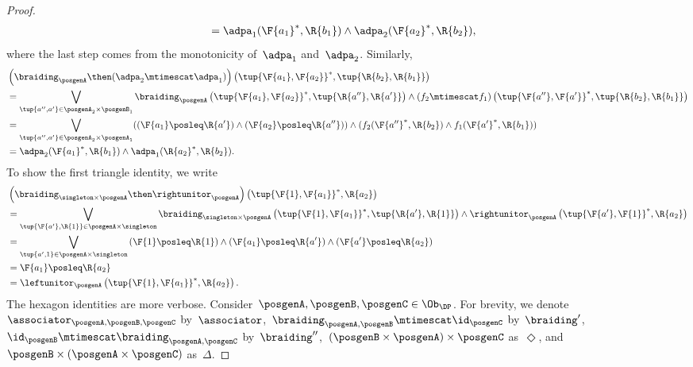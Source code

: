 \begin{proof}
\begin{equation}
\begin{aligned}
            &= \adpa_1(\F{a_1}^*,\R{b_1}) \wedge \adpa_2(\F{a_2}^*,\R{b_2}),
        \end{aligned}
    \end{equation}
    where the last step comes from the monotonicity of~$\adpa_1$ and~$\adpa_2$. Similarly,
    \begin{equation}
        \begin{aligned}
            &\left( \braiding_\posgenA \then (\adpa_2\mtimescat \adpa_1)\right)\left( \tup{\F{a_1},\F{a_2}}^*,\tup{\R{b_2},\R{b_1}}\right)\\
            &=\bigvee_{\tup{a'',a'}\in \posgenA_2\times \posgenB_1}\braiding_\posgenA\left(\tup{\F{a_1},\F{a_2}}^*,\tup{\R{a''},\R{a'}} \right)\wedge \left(f_2\mtimescat f_1\right) \left( \tup{\F{a''},\F{a'}}^*,\tup{\R{b_2},\R{b_1}}\right)\\
            &=\bigvee_{\tup{a'',a'}\in \posgenA_2\times \posgenA_1}(\left(\F{a_1}\posleq \R{a'}\right)\wedge \left(\F{a_2}\posleq \R{a''}\right)) \wedge (f_2(\F{a''}^*,\R{b_2})\wedge f_1(\F{a'}^*,\R{b_1}))\\
            &= \adpa_2(\F{a_1}^*,\R{b_1}) \wedge \adpa_1(\R{a_2}^*,\R{b_2}).
        \end{aligned}
    \end{equation}
    To show the first triangle identity, we write
    \begin{equation}
        \begin{aligned}
            &\left(\braiding_{\singleton \times \posgenA}\then \rightunitor_\posgenA\right)\left( \tup{\F{1},\F{a_1}}^*,\R{a_2}\right)\\
            &=\bigvee_{\tup{\F{a'},\R{1}}\in \posgenA\times \singleton}\braiding_{\singleton \times \posgenA}\left( \tup{\F{1},\F{a_1}}^*,\tup{\R{a'},\R{1}}\right)\wedge \rightunitor_\posgenA\left( \tup{\F{a'},\F{1}}^*,\R{a_2}\right)\\
            &=\bigvee_{\tup{a',1}\in \posgenA\times \singleton} \left(\F{1}\posleq \R{1}\right) \wedge \left(\F{a_1}\posleq \R{a'}\right)\wedge \left(\F{a'}\posleq \R{a_2}\right)\\
            &=\F{a_1}\posleq \R{a_2}\\
            &=\leftunitor_\posgenA\left( \tup{\F{1},\F{a_1}}^*,\R{a_2}\right).
        \end{aligned}
    \end{equation}
    The hexagon identities are more verbose. Consider~$\posgenA,\posgenB,\posgenC\in \Ob_\DP$.
    For brevity, we denote~$\associator_{\posgenA,\posgenB,\posgenC}$ by~$\associator$,~$\braiding_{\posgenA,\posgenB}\mtimescat \id_\posgenC$ by~$\braiding'$,~$\id_\posgenB \mtimescat \braiding_{\posgenA,\posgenC}$ by~$\braiding''$,~$(\posgenB\times \posgenA)\times \posgenC$ as~$\Diamond$, and~$\posgenB\times (\posgenA\times \posgenC)$ as~$\Delta$.

\end{proof}
